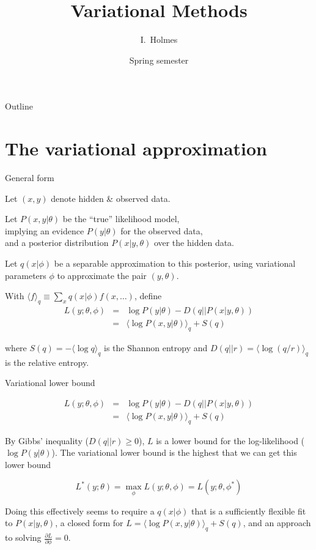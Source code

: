 \documentclass{beamer}
\title[Variational] %
{Variational Methods}
\author%
{I.~Holmes} %
\institute[University of California, Berkeley] %
{
  Department of Bioengineering\\
  University of California, Berkeley}
\date%
{Spring semester}
\begin{document}
\begin{frame}
  \titlepage
\end{frame}

\begin{frame}{Outline}
  \tableofcontents
\end{frame}

\section{The variational approximation}

\begin{frame}{General form}

Let $(x,y)$ denote hidden \& observed data.

Let $P(x,y|\theta)$ be the ``true'' likelihood model, \\
implying an evidence $P(y|\theta)$ for the observed data, \\
and a posterior distribution $P(x|y,\theta)$ over the hidden data.

Let $q(x|\phi)$ be a separable approximation to this posterior,
using variational parameters $\phi$
to approximate the pair $(y,\theta)$.

With $\langle f \rangle_q \equiv \sum_x q(x|\phi) f(x,\ldots)$, define
\begin{eqnarray*}
L(y;\theta,\phi) & = & \log P(y|\theta) - D\left(q||P(x|y,\theta)\right) \\
& = & \langle \log P(x,y|\theta) \rangle_q + S\left( q \right)
\end{eqnarray*}

where $S(q) = -\langle \log q \rangle_q$ is the Shannon entropy
and $D(q||r) = \langle \log (q/r) \rangle_q$ is the relative entropy.

\end{frame}


\begin{frame}{Variational lower bound}

\begin{eqnarray*}
L(y;\theta,\phi) & = & \log P(y|\theta) - D\left(q||P(x|y,\theta)\right) \\
& = & \langle \log P(x,y|\theta) \rangle_q + S\left( q \right)
\end{eqnarray*}

By Gibbs' inequality ($D(q||r) \geq 0$), $L$ is a lower bound for the log-likelihood ($\log P(y|\theta)$).
The variational lower bound is the highest that we can get this lower bound

\[
L^\ast(y;\theta) = \max_{\phi} L(y;\theta,\phi) = L(y;\theta,\phi^\ast)
\]

Doing this effectively seems to require
 a $q(x|\phi)$ that is a sufficiently flexible fit to $P(x|y,\theta)$,
 a closed form for $L = \langle \log P(x,y|\theta) \rangle_q + S(q)$,
 and an approach to solving $\frac{\partial{L}}{\partial{\phi}} = 0$.

\end{frame}
\end{document}
